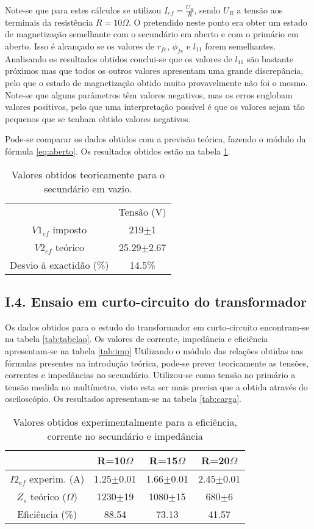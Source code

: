 \documentclass[%
  reprint,
  nofootinbib,
  amsmath,amssymb,
  aps,
  10pt,
]{revtex4-1}
\begin{document}
Note-se que para estes cálculos se utilizou $I_{ef}=	\frac{U_R}{R}$, sendo $U_R$ a tensão aos terminais da resistência $R=10\Omega$.
O pretendido neste ponto era obter um estado de magnetização semelhante com o secundário em aberto e com o primário em aberto. Isso é alcançado se os valores de $r_{fe}$, $\phi_{fe}$  e $l_{11}$ forem semelhantes. Analisando os resultados obtidos conclui-se que os valores de $l_{11}$ são bastante próximos mas que todos os outros valores apresentam uma grande discrepância, pelo que o estado de magnetização obtido muito provavelmente não foi o mesmo.
Note-se que alguns parâmetros têm valores negativos, mas os erros englobam valores positivos, pelo que uma interpretação possível é que os valores sejam tão pequenos que se tenham obtido valores negativos.

Pode-se comparar os dados obtidos com a previsão teórica, fazendo o módulo da fórmula \ref{eq:aberto}. Os resultados obtidos estão na tabela \ref{tab:vazio}.
\begin{table}[h]
\begin{tabular}{cc}
                       & Tensão (V)     \\
$V1_{ef}$  imposto     & 219$\pm$1      \\
$V2_{ef}$ teórico      & 25.29$\pm$2.67 \\
Desvio à exactidão (\%) & 14.5\%        
\end{tabular}
\caption{Valores obtidos teoricamente para o secundário em vazio.}
\label{tab:vazio}
\end{table}

\subsection*{I.4. Ensaio em curto-circuito do transformador}
Os dados obtidos para o estudo do transformador em curto-circuito encontram-se na tabela \ref{tab:tabelao}. Os valores de corrente, impedância e eficiência apresentam-se na tabela \ref{tab:imp} Utilizando o módulo das relações obtidas nas fórmulas presentes na introdução teórica, pode-se prever teoricamente as tensões, correntes e impedâncias no secundário. Utilizou-se como tensão no primário a tensão medida no multímetro, visto esta ser mais precisa que a obtida através do osciloscópio. Os resultados apresentam-se na tabela \ref{tab:carga}.

\begin{table}[h]
\begin{tabular}{c|c|c|c}
                         & R=10$\Omega$  & R=15$\Omega$  & R=20$\Omega$  \\ \hline
$I2_{ef}$ experim. (A)   & 1.25$\pm$0.01 & 1.66$\pm$0.01 & 2.45$\pm$0.01 \\ \hline
$Z_s$ teórico ($\Omega$) & 1230$\pm$19   & 1080$\pm$15   & 680$\pm$6     \\ \hline
Eficiência (\%)          & 88.54         & 73.13         & 41.57        
\end{tabular}
\caption{Valores obtidos experimentalmente para a eficiência, corrente no secundário e impedância}
\end{table}
\end{document}

